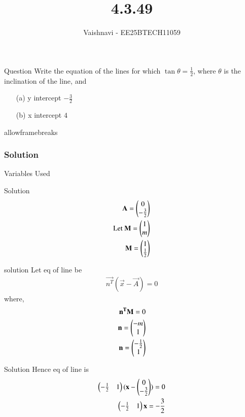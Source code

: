 \documentclass{beamer}
\title %
{4.3.49}
\author %
{Vaishnavi - EE25BTECH11059}
\begin{document}
\frame{\titlepage}
\begin{frame}{Question}
Write the equation of the lines for which $\tan\theta = \frac{1}{2}$, where $\theta$ is the inclination of the line, and
\begin{enumerate}
\item[(a)] y intercept $- \frac{3}{2}$
\item[(b)] x intercept $4$
\end{enumerate}
\end{frame}
\begin{frame}{allowframebreaks}
\frametitle{Solution}
\begin{table}[H]    
  \centering
  
  \caption{Variables Used}
  \label{tab:1.10.2}
\end{table}

\end{frame}


\begin{frame}{Solution}
\begin{align}
\mathbf{A}=\begin{pmatrix}
                0
                \\
                 -\frac{3}{2}  \end{pmatrix}\\
\text{Let }\mathbf{M}=\begin{pmatrix}
                           1
                           \\
                            m
                            \end{pmatrix}\\
            \mathbf{M}=\begin{pmatrix}
                           1
                           \\
                            \frac{1}{2}
                            \end{pmatrix}
\end{align}

\end{frame}

\begin{frame}{solution}
Let eq of line be
\begin{align}
\vec{n^T}(\vec{x}-\vec{A})=0
\end{align}
where,
\begin{align}
\mathbf{n^T}\mathbf{M}=0\\
\mathbf{n}=\begin{pmatrix}-m
               \\
               1\end{pmatrix}\\
\mathbf{n}=\begin{pmatrix}-\frac{1}{2}
                \\
                1\end{pmatrix}
\end{align}
\end{frame}
\begin{frame}{Solution}
Hence eq of line is
\begin{align}
\begin{pmatrix}-\frac{1}{2}&1\end{pmatrix}
(\mathbf{x}-    
\begin{pmatrix}
           0
           \\
            -\frac{3}{2}
               \end{pmatrix}   )
=0\\
\begin{pmatrix}-\frac{1}{2}&1\end{pmatrix}\mathbf{x}
=-\frac{3}{2}
\end{align}
\end{frame}
\end{document}
